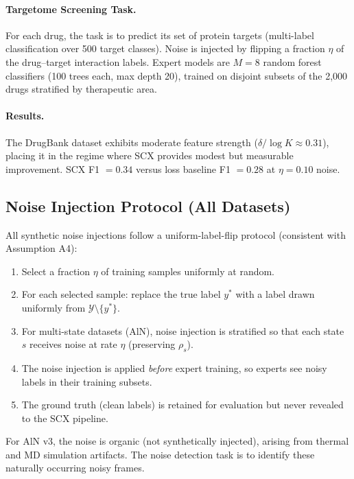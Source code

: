 \paragraph{Targetome Screening Task.}
For each drug, the task is to predict its set of protein targets (multi-label classification over 500 target classes). Noise is injected by flipping a fraction $\eta$ of the drug--target interaction labels. Expert models are $M = 8$ random forest classifiers (100 trees each, max depth 20), trained on disjoint subsets of the 2,000 drugs stratified by therapeutic area.

\paragraph{Results.}
The DrugBank dataset exhibits moderate feature strength ($\delta / \log K \approx 0.31$), placing it in the regime where SCX provides modest but measurable improvement. SCX F1 $= 0.34$ versus loss baseline F1 $= 0.28$ at $\eta = 0.10$ noise.

\subsection{Noise Injection Protocol (All Datasets)}

All synthetic noise injections follow a uniform-label-flip protocol (consistent with Assumption A4):

\begin{enumerate}
    \item Select a fraction $\eta$ of training samples uniformly at random.
    \item For each selected sample: replace the true label $y^*$ with a label drawn uniformly from $\mathcal{Y} \setminus \{y^*\}$.
    \item For multi-state datasets (AlN), noise injection is stratified so that each state $s$ receives noise at rate $\eta$ (preserving $\rho_s$).
    \item The noise injection is applied \emph{before} expert training, so experts see noisy labels in their training subsets.
    \item The ground truth (clean labels) is retained for evaluation but never revealed to the SCX pipeline.
\end{enumerate}

For AlN v3, the noise is organic (not synthetically injected), arising from thermal and MD simulation artifacts. The noise detection task is to identify these naturally occurring noisy frames.

